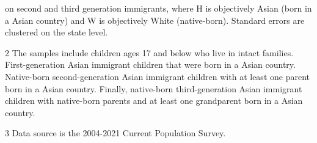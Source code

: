 \begin{table}[!h]
{\begin{threeparttable}
\begin{tablenotes}
{                      on second and third generation immigrants, where H is objectively Asian (born in a Asian country) and W is objectively White (native-born). 
                      Standard errors are clustered on the state level.}
\item[2] \footnotesize{The samples include children ages 17 and below who live in intact families. 
                      First-generation Asian immigrant children that were born in a 
                      Asian country. Native-born second-generation Asian 
                      immigrant children with at least one parent born in a Asian 
                      country. Finally, native-born third-generation Asian immigrant children 
                      with native-born parents and at least one grandparent born in a Asian country.}
\item[3] \footnotesize{Data source is the 2004-2021 Current Population Survey.}
\end{tablenotes}
\end{threeparttable}}
\end{table}
